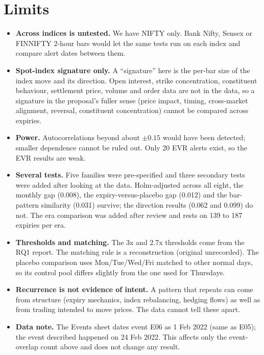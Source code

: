 \documentclass[10pt,a4paper]{article}
\begin{document}
\section*{Limits}
\begin{itemize}
\item \textbf{Across indices is untested.} We have NIFTY only. Bank Nifty, Sensex or FINNIFTY 2-hour bars would let the same tests run on each index and compare alert dates between them.
\item \textbf{Spot-index signature only.} A ``signature'' here is the per-bar size of the index move and its direction. Open interest, strike concentration, constituent behaviour, settlement price, volume and order data are not in the data, so a signature in the proposal's fuller sense (price impact, timing, cross-market alignment, reversal, constituent concentration) cannot be compared across expiries.
\item \textbf{Power.} Autocorrelations beyond about $\pm0.15$ would have been detected; smaller dependence cannot be ruled out. Only 20 EVR alerts exist, so the EVR results are weak.
\item \textbf{Several tests.} Five families were pre-specified and three secondary tests were added after looking at the data. Holm-adjusted across all eight, the monthly gap (0.008), the expiry-versus-placebo gap (0.012) and the bar-pattern similarity (0.031) survive; the direction results (0.062 and 0.099) do not. The era comparison was added after review and rests on 139 to 187 expiries per era.
\item \textbf{Thresholds and matching.} The 3x and 2.7x thresholds come from the RQ1 report. The matching rule is a reconstruction (original unrecorded). The placebo comparison uses Mon/Tue/Wed/Fri matched to other normal days, so its control pool differs slightly from the one used for Thursdays.
\item \textbf{Recurrence is not evidence of intent.} A pattern that repeats can come from structure (expiry mechanics, index rebalancing, hedging flows) as well as from trading intended to move prices. The data cannot tell these apart.
\item \textbf{Data note.} The Events sheet dates event E06 as 1 Feb 2022 (same as E05); the event described happened on 24 Feb 2022. This affects only the event-overlap count above and does not change any result.
\end{itemize}
\end{document}
